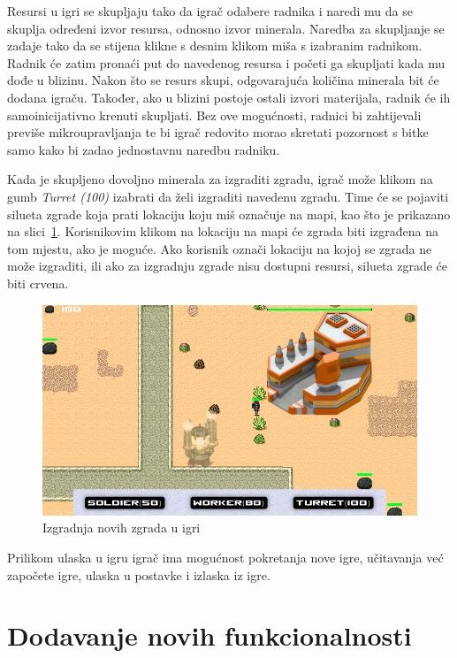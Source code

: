 \documentclass[times, utf8, zavrsni, numeric]{fer}
\begin{document}
\par Resursi u igri se skupljaju tako da igrač odabere radnika i naredi mu da se skuplja određeni izvor resursa, odnosno izvor minerala.
Naredba za skupljanje se zadaje tako da se stijena klikne s desnim klikom miša s izabranim radnikom.
Radnik će zatim pronaći put do navedenog resursa i početi ga skupljati kada mu dođe u blizinu.
Nakon što se resurs skupi, odgovarajuća količina minerala bit će dodana igraču.
Također, ako u blizini postoje ostali izvori materijala, radnik će ih samoinicijativno krenuti skupljati.
Bez ove mogućnosti, radnici bi zahtijevali previše mikroupravljanja te bi igrač redovito morao skretati pozornost s bitke samo kako bi zadao jednostavnu naredbu radniku.

\par Kada je skupljeno dovoljno minerala za izgraditi zgradu, igrač može klikom na gumb \textit{Turret (100)} izabrati da želi izgraditi navedenu zgradu.
Time će se pojaviti silueta zgrade koja prati lokaciju koju miš označuje na mapi, kao što je prikazano na slici~\ref{fig:building}.
Korisnikovim klikom na lokaciju na mapi će zgrada biti izgrađena na tom mjestu, ako je moguće.
Ako korisnik označi lokaciju na kojoj se zgrada ne može izgraditi, ili ako za izgradnju zgrade nisu dostupni resursi, silueta zgrade će biti crvena.

\begin{figure}[h]
	\centering
	\includegraphics[width=0.9\linewidth]{images/building.png}
	\caption{Izgradnja novih zgrada u igri}
	\label{fig:building}
\end{figure}

\par Prilikom ulaska u igru igrač ima mogućnost pokretanja nove igre, učitavanja već započete igre, ulaska u postavke i izlaska iz igre.

\section{Dodavanje novih funkcionalnosti}
\end{document}
